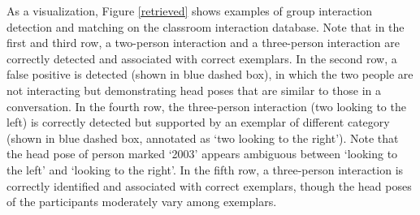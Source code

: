 As a visualization, Figure \ref{retrieved} shows examples of group interaction detection and matching on the classroom interaction database. Note that in the first and third row, a two-person interaction and a three-person interaction are correctly detected and associated with correct exemplars. In the second row, a false positive is detected (shown in blue dashed box), in which the two people are not interacting but demonstrating head poses that are similar to those in a conversation. In the fourth row, the three-person interaction (two looking to the left) is correctly detected but supported by an exemplar of different category (shown in blue dashed box, annotated as `two looking to the right'). Note that the head pose of person marked `2003' appears ambiguous between `looking to the left' and `looking to the right'. In the fifth row, a three-person interaction is correctly identified and associated with correct exemplars, though the head poses of the participants moderately vary among exemplars. 

\vspace{0.05in}
